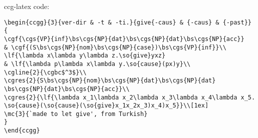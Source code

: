 \documentclass[11pt]{article}
\begin{document}
ccg-latex code:\bigskip

\begin{verbatim}
\begin{ccgg}{3}{ver-dir & -t & -ti.}{give{-caus} & {-caus} & {-past}}
{
\cgf{\cgs{VP}{inf}\bs\cgs{NP}{dat}\bs\cgs{NP}{dat}\bs\cgs{NP}{acc}}
& \cgf{(S\bs\cgs{NP}{nom}\bs\cgs{NP}{case})\bs\cgs{VP}{inf}}\\
\lf{\lambda x\lambda y\lambda z.\so{give}yxz} 
& \lf{\lambda p\lambda x\lambda y.\so{cause}(px)y}\\
\cgline{2}{\cgbc$^3$}\\ 
\cgres{2}{S\bs\cgs{NP}{nom}\bs\cgs{NP}{dat}\bs\cgs{NP}{dat}
\bs\cgs{NP}{dat}\bs\cgs{NP}{acc}}\\
\cgres{2}{\lf{\lambda x_1\lambda x_2\lambda x_3\lambda x_4\lambda x_5.
\so{cause}(\so{cause}(\so{give}x_1x_2x_3)x_4)x_5}}\\[1ex]
\mc{3}{`made to let give', from Turkish}
}
\end{ccgg}
\end{verbatim}
\end{document}
